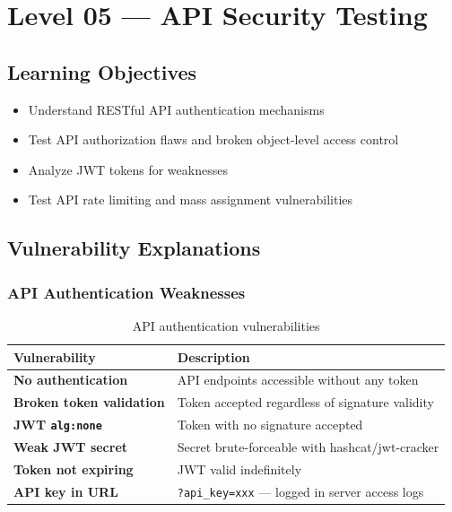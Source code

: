 \chapter{Level 05 — API Security Testing}
\label{ch:level05}


\section{Learning Objectives}
\begin{itemize}
  \item Understand RESTful API authentication mechanisms
  \item Test API authorization flaws and broken object-level access control
  \item Analyze JWT tokens for weaknesses
  \item Test API rate limiting and mass assignment vulnerabilities
\end{itemize}

\section{Vulnerability Explanations}

\subsection{API Authentication Weaknesses}

\begin{table}[H]
\centering
\caption{API authentication vulnerabilities}
\begin{tabularx}{\textwidth}{>{\bfseries}lX}
\toprule
Vulnerability & Description \\
\midrule
No authentication & API endpoints accessible without any token \\
Broken token validation & Token accepted regardless of signature validity \\
JWT \texttt{alg:none} & Token with no signature accepted \\
Weak JWT secret & Secret brute-forceable with hashcat/jwt-cracker \\
Token not expiring & JWT valid indefinitely \\
API key in URL & \texttt{?api\_key=xxx} — logged in server access logs \\
\bottomrule
\end{tabularx}
\end{table}

